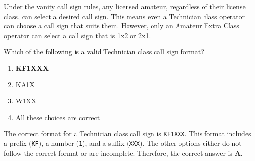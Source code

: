 Under the vanity call sign rules, any licensed amateur, regardless of their license class, can select a desired call sign. This means even a Technician class operator can choose a call sign that suits them. However, only an Amateur Extra Class operator can select a call sign that is 1x2 or 2x1.

\begin{tcolorbox}[colback=gray!10!white,colframe=black!75!black,title={T1C05}]
    Which of the following is a valid Technician class call sign format?
    \begin{enumerate}[label=\Alph*),noitemsep]
        \item \textbf{KF1XXX}
        \item KA1X
        \item W1XX
        \item All these choices are correct
    \end{enumerate}
\end{tcolorbox}

The correct format for a Technician class call sign is \texttt{KF1XXX}. This format includes a prefix (\texttt{KF}), a number (\texttt{1}), and a suffix (\texttt{XXX}). The other options either do not follow the correct format or are incomplete. Therefore, the correct answer is \textbf{A}.
